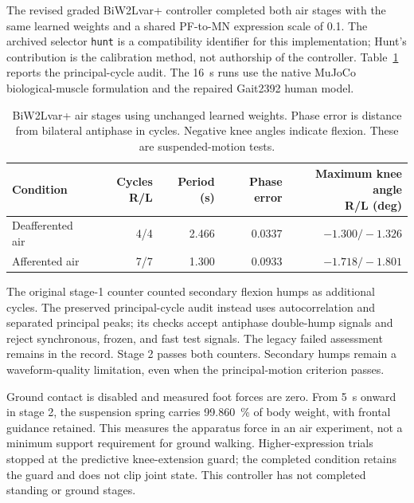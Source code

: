 The revised graded BiW2Lvar+ controller completed both air stages with the same learned weights and a shared PF-to-MN expression scale of 0.1. The archived selector \texttt{hunt} is a compatibility identifier for this implementation; Hunt's contribution is the calibration method, not authorship of the controller. Table~\ref{tab:app_air_stages} reports the principal-cycle audit. The \qty{16}{\second} runs use the native MuJoCo biological-muscle formulation and the repaired Gait2392 human model.

\begin{table}[htbp]
\centering\small
\caption[Fixed-controller air-stage evaluations]{BiW2Lvar+ air stages using unchanged learned weights. Phase error is distance from bilateral antiphase in cycles. Negative knee angles indicate flexion. These are suspended-motion tests.}
\label{tab:app_air_stages}
\begin{tabularx}{\textwidth}{@{}>{\raggedright\arraybackslash}Xrrrr@{}}
\toprule
Condition & Cycles R/L & Period (s) & Phase error & \shortstack{Maximum knee angle\\R/L (deg)} \\
\midrule
Deafferented air & 4/4 & 2.466 & 0.0337 & $-1.300/-1.326$ \\
Afferented air & 7/7 & 1.300 & 0.0933 & $-1.718/-1.801$ \\
\bottomrule
\end{tabularx}
\end{table}

The original stage-1 counter counted secondary flexion humps as additional cycles. The preserved principal-cycle audit instead uses autocorrelation and separated principal peaks; its checks accept antiphase double-hump signals and reject synchronous, frozen, and fast test signals. The legacy failed assessment remains in the record. Stage 2 passes both counters. Secondary humps remain a waveform-quality limitation, even when the principal-motion criterion passes.

Ground contact is disabled and measured foot forces are zero. From \qty{5}{\second} onward in stage 2, the suspension spring carries \qty{99.860}{\percent} of body weight, with frontal guidance retained. This measures the apparatus force in an air experiment, not a minimum support requirement for ground walking. Higher-expression trials stopped at the predictive knee-extension guard; the completed condition retains the guard and does not clip joint state. This controller has not completed standing or ground stages.

